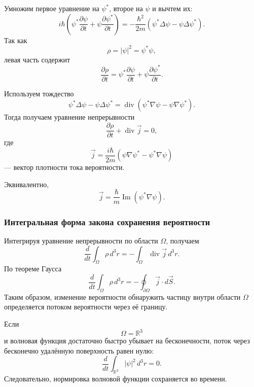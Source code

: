 \documentclass[12pt,a4paper]{article}
\begin{document}
Умножим первое уравнение на $\psi^*$, второе на $\psi$ и вычтем их:
\[
    i\hbar
    \left(
        \psi^*
        \frac{\partial\psi}{\partial t}
        +
        \psi
        \frac{\partial\psi^*}{\partial t}
    \right)
    =
    -\frac{\hbar^2}{2m}
    \left(
        \psi^*\Delta\psi
        -
        \psi\Delta\psi^*
    \right).
\]
Так как
\[
    \rho
    =
    |\psi|^2
    =
    \psi^*\psi,
\]
левая часть содержит
\[
    \frac{\partial\rho}{\partial t}
    =
    \psi^*
    \frac{\partial\psi}{\partial t}
    +
    \psi
    \frac{\partial\psi^*}{\partial t}.
\]

Используем тождество
\[
    \psi^*\Delta\psi-\psi\Delta\psi^*
    =
    \operatorname{div}
    \left(
        \psi^*\nabla\psi
        -
        \psi\nabla\psi^*
    \right).
\]
Тогда получаем уравнение непрерывности
\[
    \boxed{
        \frac{\partial\rho}{\partial t}
        +
        \operatorname{div}\vec j
        =
        0
    },
\]
где
\[
    \boxed{
        \vec j
        =
        \frac{i\hbar}{2m}
        \left(
            \psi\nabla\psi^*
            -
            \psi^*\nabla\psi
        \right)
    }
\]
--- вектор плотности тока вероятности.

Эквивалентно,
\[
    \vec j
    =
    \frac{\hbar}{m}
    \operatorname{Im}
    \left(
        \psi^*\nabla\psi
    \right).
\]


\subsubsection{Интегральная форма закона сохранения вероятности}

Интегрируя уравнение непрерывности по области $\Omega$, получаем
\[
    \frac{d}{dt}
    \int_\Omega
        \rho\,d^3r
    =
    -
    \int_\Omega
        \operatorname{div}\vec j\,d^3r.
\]
По теореме Гаусса
\[
    \boxed{
    \frac{d}{dt}
    \int_\Omega
        \rho\,d^3r
    =
    -
    \oint_{\partial\Omega}
        \vec j\cdot d\vec S
    }.
\]
Таким образом, изменение вероятности обнаружить частицу внутри области
$\Omega$ определяется потоком вероятности через её границу.

Если
\[
    \Omega=\mathbb R^3
\]
и волновая функция достаточно быстро убывает на бесконечности, поток
через бесконечно удалённую поверхность равен нулю:
\[
    \frac{d}{dt}
    \int_{\mathbb R^3}
        |\psi|^2\,d^3r
    =
    0.
\]
Следовательно, нормировка волновой функции сохраняется во времени.
\end{document}
